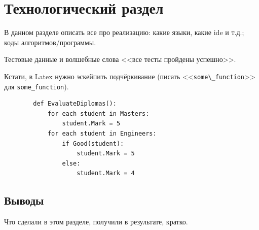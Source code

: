 \chapter{Технологический раздел}
\label{cha:tech}

В данном разделе описать все про реализацию: какие языки, какие ide и т.д.; коды алгоритмов/программы.

Тестовые данные и волшебные слова <<все тесты пройдены успешно>>.

Кстати, в Latex нужно эскейпить подчёркивание (писать <<\verb|some\_function|>> для \texttt{some\_function}).

\begin{listing}[H]
    \begin{verbatim}
        def EvaluateDiplomas():
            for each student in Masters:
                student.Mark = 5
            for each student in Engineers:
                if Good(student):
                    student.Mark = 5
                else:
                    student.Mark = 4
    \end{verbatim}
\end{listing}

\section*{Выводы}

Что сделали в этом разделе, получили в результате, кратко.

